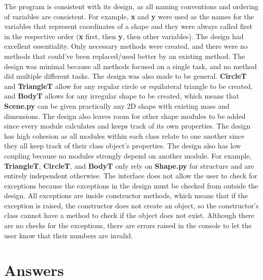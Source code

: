 \documentclass[12pt]{article}
\begin{document}
	The program is consistent with its design, as all naming conventions and ordering of variables are consistent. For example, \textbf{x} and \textbf{y} were used as the names for the variables that represent coordinates of a shape and they were always called first in the respective order (\textbf{x} first, then \textbf{y}, then other variables). The design had excellent essentiality. Only necessary methods were created, and there were no methods that could’ve been replaced/used better by an existing method. The design was minimal because all methods focused on a single task, and no method did multiple different tasks. The design was also made to be general. \textbf{CircleT} and \textbf{TriangleT} allow for any regular circle or equilateral triangle to be created, and \textbf{BodyT} allows for any irregular shape to be created, which means that \textbf{Scene.py} can be given practically any 2D shape with existing mass and dimensions. The design also leaves room for other shape modules to be added since every module calculates and keeps track of its own properties. The design has high cohesion as all modules within each class relate to one another since they all keep track of their class object’s properties. The design also has low coupling because no modules strongly depend on another module. For example, \textbf{TriangleT}, \textbf{CircleT}, and \textbf{BodyT} only rely on \textbf{Shape.py} for structure and are entirely  independent otherwise. The interface does not allow the user to check for exceptions because the exceptions in the design must be checked from outside the design. All exceptions are inside constructor methods, which means that if the exception is raised, the constructor does not create an object, so the constructor’s class cannot have a method to check if the object does not exist. Although there are no checks for the exceptions, there are errors raised in the console to let the user know that their numbers are invalid. 

\section{Answers}
\end{document}

